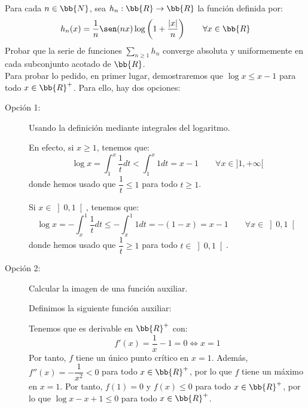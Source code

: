 \begin{ejercicio}
    Para cada $n\in \bb{N}$, sea $h_n:\bb{R}\to \bb{R}$ la función definida por:
    \begin{equation*}
        h_n(x) = \frac{1}{n}\sen(nx)\log\left(1+\frac{|x|}{n}\right) \qquad \forall x\in \bb{R}
    \end{equation*}
    Probar que la serie de funciones $\sum\limits_{n\geq 1}h_n$ converge absoluta y uniformemente en cada
    subconjunto acotado de $\bb{R}$.\\

    Para probar lo pedido, en primer lugar, demostraremos que $\log x \leq x-1$ para todo $x\in \bb{R}^+$. Para ello, hay dos opciones:
    \begin{description}
        \item[Opción 1:] Usando la definición mediante integrales del logaritmo.
        
        En efecto, si $x\geq 1$, tenemos que:
        \begin{equation*}
            \log x = \int_1^x \frac{1}{t}dt < \int_1^x 1dt = x-1 \qquad \forall x\in ]1,+\infty[
        \end{equation*}
        donde hemos usado que $\dfrac{1}{t}\leq 1$ para todo $t\geq 1$.

        Si $x\in \left]0,1\right[$, tenemos que:
        \begin{equation*}
            \log x = -\int_x^1 \frac{1}{t}dt \leq -\int_x^1 1dt = -(1-x)=x-1 \qquad \forall x\in \left]0,1\right[
        \end{equation*}
        donde hemos usado que $\dfrac{1}{t}\geq 1$ para todo $t\in \left]0,1\right[$.

        \item[Opción 2:] Calcular la imagen de una función auxiliar.
        
        Definimos la siguiente función auxiliar:
        
        Tenemos que es derivable en $\bb{R}^+$ con:
        \begin{equation*}
            f'(x) = \frac{1}{x} - 1 = 0 \Longleftrightarrow x=1
        \end{equation*}
        Por tanto, $f$ tiene un único punto crítico en $x=1$. Además, $f''(x) = -\dfrac{1}{x^2} < 0$ para todo $x\in \bb{R}^+$, por lo que $f$ tiene un máximo en $x=1$.
        Por tanto, $f(1)=0$ y $f(x)\leq 0$ para todo $x\in \bb{R}^+$, por lo que $\log x -x+1\leq 0$ para todo $x\in \bb{R}^+$.
    \end{description}


\end{ejercicio}
